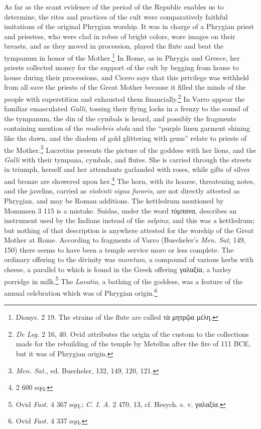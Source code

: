\documentclass[a4paper, 11pt, oneside, polutonikogreek, english]{article}
\begin{document}
As far as the scant evidence of the period of the Republic enables us to determine, the rites and practices of the cult were comparatively faithful imitations of the original Phrygian worship. It was in charge of a Phrygian priest and priestess, who were clad in robes of bright colors, wore images on their breasts, and as they moved in procession, played the flute and beat the tympanum in honor of the Mother.\footnote{Dionys. 2 19. The strains of the flute are called τὰ μητρῷα μέλη.} In Rome, as in Phrygia and Greece, her priests collected money for the support of the cult by begging from house to house during their processions, and Cicero says that this privilege was withheld from all save the priests of the Great Mother because it filled the minds of the people with superstition and exhausted them financially.\footnote{\emph{De Leg.} 2 16, 40. Ovid attributes the origin of the custom to the collections made for the rebuilding of the temple by Metellus after the fire of 111 \textsc{BCE}, but it was of Phrygian origin.} In Varro appear the familiar emasculated \emph{Galli}, tossing their flying locks in a frenzy to the sound of the tympanum, the din of the cymbals is heard, and possibly the fragments containing mention of the \emph{muliebris stola} and the ``purple linen garment shining like the dawn, and the diadem of gold glittering with gems'' relate to priests of the Mother.\footnote{\emph{Men. Sat.}, ed. Buecheler, 132, 149, 120, 121.} Lucretius presents the picture of the goddess with her lions, and the \emph{Galli} with their tympana, cymbals, and flutes. She is carried through the streets in triumph, herself and her attendants garlanded with roses, while gifts of silver and bronze are showered upon her.\footnote{2 600 sqq.} The horn, with its hoarse, threatening notes, and the javelins, carried as \emph{violenti signa furoris}, are not directly attested as Phrygian, and may be Roman additions. The kettledrum mentioned by Mommsen 3 115 is a mistake. Suidas, under the word τύμπανα, describes an instrument used by the Indians instead of the \emph{salpinx}, and this was a kettledrum; but nothing of that description is anywhere attested for the worship of the Great Mother at Rome. According to fragments of Varro (Buecheler's \emph{Men. Sat}, 149, 150) there seems to have been a temple service more or less complete. The ordinary offering to the divinity was \emph{moretum}, a compound of various herbs with cheese, a parallel to which is found in the Greek offering γαλαξία, a barley porridge in milk.\footnote{Ovid \emph{Fast.} 4 367 sqq.; \emph{C. I. A.} 2 470, 13, cf. Hesych. s. v. γαλαξία.} The \emph{Lavatio}, a bathing of the goddess, was a feature of the annual celebration which was of Phrygian origin.\footnote{Ovid \emph{Fast.} 4 337 sqq.}
\end{document}
